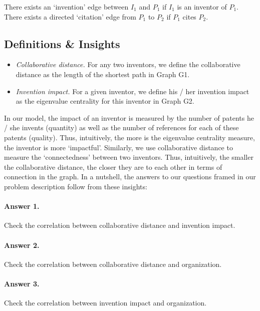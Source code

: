 There exists an `invention' edge between $I_1$ and $P_1$ if $I_1$ is an inventor of $P_1$.
There exists a directed `citation' edge from $P_1$ to $P_2$ if $P_1$ cites $P_2$.

\subsection{Definitions \& Insights}

	\begin{itemize}
	\squish
		\item {\em Collaborative distance.} For any two inventors, we define
		the collaborative distance as the length of the shortest path in
		Graph G1.
		\item {\em Invention impact.} For a given inventor, we define his /
		her invention impact as the eigenvalue centrality for this inventor
		in Graph G2.
	\end{itemize}


In our model, the impact of an inventor is measured by the number of patents
he / she invents (quantity) as well as the number of references for each of
these patents (quality). Thus, intuitively, the more is the eigenvalue
centrality measure, the inventor is more `impactful'. Similarly, we use
collaborative distance to measure the `connectedness' between two inventors.
Thus, intuitively, the smaller the collaborative distance, the closer they are
to each other in terms of connection in the graph.  In a nutshell, the answers
to our questions framed in our problem description follow from these insights:

\paragraph{Answer 1.} Check the correlation between collaborative distance and invention impact. 

\paragraph{Answer 2.} Check the correlation between collaborative distance and organization.

\paragraph{Answer 3.} Check the correlation between invention impact and organization.
